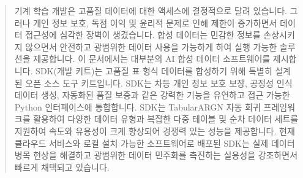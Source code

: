 \documentclass[journal]{IEEEtran}
\begin{document}
% 











\maketitle

\begin{abstract}
기계 학습 개발은 고품질 데이터에 대한 액세스에 결정적으로 달려 있습니다. 그러나 개인 정보 보호, 독점 이익 및 윤리적 문제로 인해 제한이 증가하면서 데이터 접근성에 심각한 장벽이 생겼습니다. 합성 데이터는 민감한 정보를 손상시키지 않으면서 안전하고 광범위한 데이터 사용을 가능하게 하여 실행 가능한 솔루션을 제공합니다. 이 문서에서는 대부분의 AI 합성 데이터 소프트웨어를 제시합니다.
SDK(개발 키트)는 고품질 표 형식 데이터를 합성하기 위해 특별히 설계된 오픈 소스 도구 키트입니다. SDK는 차등 개인 정보 보호 보장, 공정성 인식 데이터 생성, 자동화된 품질 보증과 같은 강력한 기능을 유연하고 접근 가능한 Python 인터페이스에 통합합니다. SDK는 TabularARGN 자동 회귀 프레임워크를 활용하여 다양한 데이터 유형과 복잡한 다중 테이블 및 순차 데이터 세트를 지원하여 속도와 유용성이 크게 향상되어 경쟁력 있는 성능을 제공합니다. 현재 클라우드 서비스와 로컬 설치 가능한 소프트웨어로 배포된 SDK는 실제 데이터 병목 현상을 해결하고 광범위한 데이터 민주화를 촉진하는 실용성을 강조하면서 빠르게 채택되고 있습니다.
\end{abstract}
\end{document}
